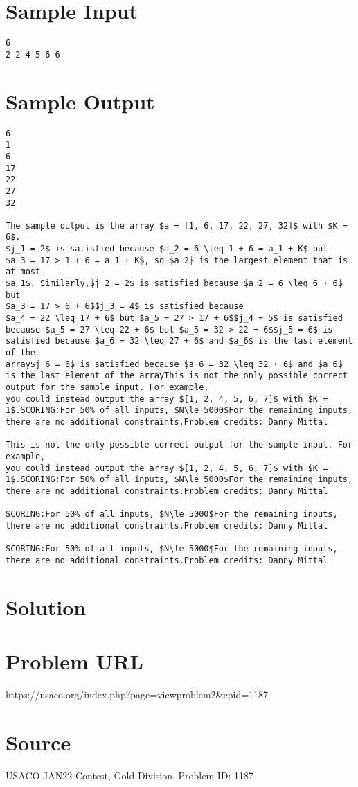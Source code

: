 \documentclass[12pt]{article}
\begin{document}
\section*{Sample Input}
\begin{verbatim}
6
2 2 4 5 6 6
\end{verbatim}

\section*{Sample Output}
\begin{verbatim}
6
1
6
17
22
27
32

The sample output is the array $a = [1, 6, 17, 22, 27, 32]$ with $K = 6$.
$j_1 = 2$ is satisfied because $a_2 = 6 \leq 1 + 6 = a_1 + K$ but
$a_3 = 17 > 1 + 6 = a_1 + K$, so $a_2$ is the largest element that is at most
$a_1$. Similarly,$j_2 = 2$ is satisfied because $a_2 = 6 \leq 6 + 6$ but
$a_3 = 17 > 6 + 6$$j_3 = 4$ is satisfied because
$a_4 = 22 \leq 17 + 6$ but $a_5 = 27 > 17 + 6$$j_4 = 5$ is satisfied
because $a_5 = 27 \leq 22 + 6$ but $a_5 = 32 > 22 + 6$$j_5 = 6$ is
satisfied because $a_6 = 32 \leq 27 + 6$ and $a_6$ is the last element of the
array$j_6 = 6$ is satisfied because $a_6 = 32 \leq 32 + 6$ and $a_6$
is the last element of the arrayThis is not the only possible correct output for the sample input. For example,
you could instead output the array $[1, 2, 4, 5, 6, 7]$ with $K = 1$.SCORING:For 50% of all inputs, $N\le 5000$For the remaining inputs, there are no additional constraints.Problem credits: Danny Mittal

This is not the only possible correct output for the sample input. For example,
you could instead output the array $[1, 2, 4, 5, 6, 7]$ with $K = 1$.SCORING:For 50% of all inputs, $N\le 5000$For the remaining inputs, there are no additional constraints.Problem credits: Danny Mittal

SCORING:For 50% of all inputs, $N\le 5000$For the remaining inputs, there are no additional constraints.Problem credits: Danny Mittal

SCORING:For 50% of all inputs, $N\le 5000$For the remaining inputs, there are no additional constraints.Problem credits: Danny Mittal
\end{verbatim}

\section*{Solution}


\section*{Problem URL}
https://usaco.org/index.php?page=viewproblem2&cpid=1187

\section*{Source}
USACO JAN22 Contest, Gold Division, Problem ID: 1187
\end{document}
